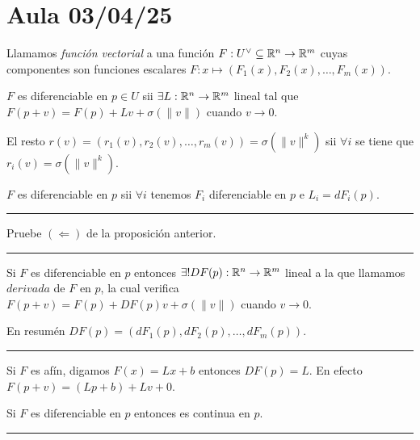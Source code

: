 \section*{Aula 03/04/25}

\begin{definition}
    Llamamos \emph{función vectorial} a una función \(F:U^\ab \subseteq \R^n \to \R^m\) cuyas componentes son funciones escalares \(F: x\mapsto (F_1(x), F_2(x), \ldots, F_m(x))\).  
\end{definition}
\begin{definition}
    \(F\) es diferenciable en \(p\in U\) sii \(\exists L:\mathbb{R}^n\to\mathbb{R}^m\) lineal tal que \(F(p+v) = F(p) + Lv + \sigma (\|v\|)\) cuando \(v\to 0\). 
\end{definition}
\begin{note}
    El resto \(r (v) = (r_1(v), r_2(v), \ldots, r_m(v)) = \sigma(\|v\|^k )\) sii \(\forall i \) se tiene que \(r_i(v) = \sigma(\|v\|^k)\).   
\end{note}
\begin{proposition}
    \(F\) es diferenciable en \(p\) sii \(\forall i\) tenemos \(F_i\) diferenciable en \(p\) e \(L_i = dF_i(p)\).  
\end{proposition}

\E

\hrule 
\begin{exercise}
    Pruebe \((\Leftarrow) \) de la proposición anterior. 
\end{exercise}
\hrule 

\E

\begin{definition}
    Si \(F\) es diferenciable en \(p\) entonces \(\exists ! DF(p): \mathbb{R}^n\to \mathbb{R}^m \) lineal a la que llamamos \(derivada\) de \(F\) en \(p\), la cual verifica \(F(p+v)= F(p) + DF(p)v + \sigma(\|v\|)\) cuando \(v\to 0\). 
\end{definition}
\begin{note}
    En resumén \(DF(p) = (dF_1(p), dF_2(p), \ldots, dF_m(p))\).  
\end{note}

\E

\hrule
\begin{example}
    Si \(F\) es afín, digamos \(F(x) = Lx + b\) entonces \(DF(p) = L \). En efecto \(F(p+v)= (Lp + b) + Lv + 0\). 
\end{example}
\begin{proposition}
    Si \(F\) es diferenciable en \(p\) entonces es continua en \(p\).  
\end{proposition}
\hrule 

